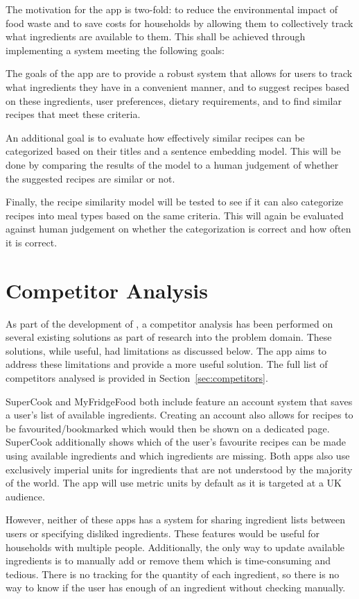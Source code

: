 The motivation for the \chef{} app is two-fold: to reduce the environmental impact of food waste and to
save costs for households by allowing them to collectively track what ingredients are available to them.
This shall be achieved through implementing a system meeting the following goals:

The goals of the \chef{} app are to provide a robust system that allows for users to track what ingredients they have in a
convenient manner, and to suggest recipes based on these ingredients, user preferences, dietary requirements, and to find
similar recipes that meet these criteria.

An additional goal is to evaluate how effectively similar recipes can be categorized based on their titles
and a sentence embedding model. This will be done by comparing the results of the model to a human judgement
of whether the suggested recipes are similar or not.

Finally, the recipe similarity model will be tested to see if it can also categorize recipes into meal types
based on the same criteria. This will again be evaluated against human judgement on whether the categorization
is correct and how often it is correct.

\section{Competitor Analysis}\label{sec:competitor_analysis}

As part of the development of \chef{}, a competitor analysis has been performed on several existing solutions as part of research
into the problem domain. These solutions, while useful, had limitations as discussed below. The \chef{} app aims to address
these limitations and provide a more useful solution. The full list of competitors analysed is provided in Section~\ref{sec:competitors}.

SuperCook and MyFridgeFood both include feature an account system
that saves a user's list of available ingredients. Creating an account also allows for recipes to be favourited/bookmarked
which would then be shown on a dedicated page. SuperCook additionally shows which of the user's favourite recipes
can be made using available ingredients and which ingredients are missing. Both apps also use exclusively imperial
units for ingredients that are not understood by the majority of the world. The \chef{} app will use metric units by default
as it is targeted at a UK audience.

However, neither of these apps has a system for sharing ingredient lists between users or specifying disliked ingredients. These features would be useful for households with multiple people.
Additionally, the only way to update available ingredients is to manually add or remove them which is time-consuming and tedious. There is no tracking for the quantity of
each ingredient, so there is no way to know if the user has enough of an ingredient without checking manually.


